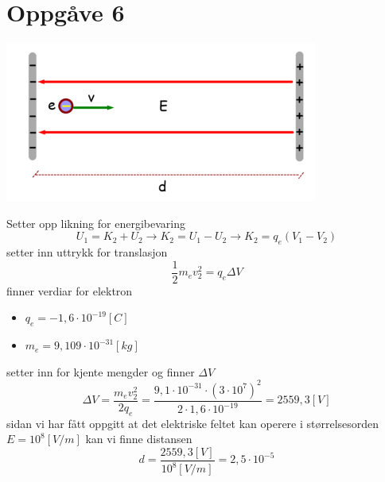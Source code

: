 \documentclass[12pt,a4paper]{article}
\begin{document}
  \section*{Oppgåve 6}
    \begin{center}
      \includegraphics[scale=0.6]{06_6.png}
    \end{center}
    Setter opp likning for energibevaring
    \begin{equation}
      U_1 = K_2 + U_2 \rightarrow K_2 = U_1 - U_2 \rightarrow K_2 = q_e(V_1 - V_2)
    \end{equation}
    setter inn uttrykk for translasjon
    \begin{equation}
      \frac{1}{2}m_e v_2^2 = q_e\Delta V
    \end{equation}
    finner verdiar for elektron
    \begin{itemize}
      \item $q_e = -1,6 \cdot 10^{-19}[C]$
      \item $m_e = 9,109 \cdot 10^{-31} [kg]$
    \end{itemize}
    setter inn for kjente mengder og finner $\Delta V$
    \begin{equation}
      \Delta V = \frac{m_ev_2^2}{2q_e} = \frac{9,1\cdot 10^{-31} \cdot (3 \cdot 10^7)^2}
      {2\cdot 1,6\cdot 10^{-19}} = 2559,3[V]
    \end{equation}
    sidan vi har fått oppgitt at det elektriske feltet kan operere i størrelsesorden
    $E = 10^8 [V/m]$ kan vi finne distansen
    \begin{equation}
      d = \frac{2559,3 [V]}{10^8[V/m]} = 2,5\cdot 10^{-5}
    \end{equation}
\end{document}
